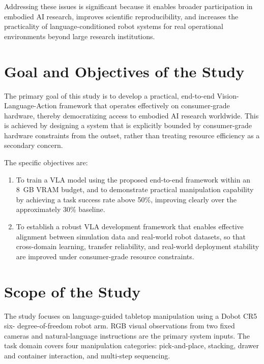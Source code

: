 Addressing these issues is significant because it enables broader participation in
embodied AI research, improves scientific reproducibility, and increases the
practicality of language-conditioned robot systems for real operational environments
beyond large research institutions.



\section{Goal and Objectives of the Study}

The primary goal of this study is to develop a practical, end-to-end
Vision-Language-Action framework that operates effectively on consumer-grade
hardware, thereby democratizing access to embodied AI research worldwide. This is
achieved by designing a system that is explicitly bounded by consumer-grade
hardware constraints from the outset, rather than treating resource efficiency as a
secondary concern.

\noindent The specific objectives are:

\begin{enumerate}
    \item To train a VLA model using the proposed end-to-end framework within an
    8~GB VRAM budget, and to demonstrate practical manipulation capability by
    achieving a task success rate above 50\%, improving clearly over the
    approximately 30\% baseline.

    \item To establish a robust VLA development framework that enables effective
    alignment between simulation data and real-world robot datasets, so that
    cross-domain learning, transfer reliability, and real-world deployment
    stability are improved under consumer-grade resource constraints.
\end{enumerate}



\section{Scope of the Study}


The study focuses on language-guided tabletop manipulation using a Dobot CR5 six-
degree-of-freedom robot arm. RGB visual observations from two fixed cameras and
natural-language instructions are the primary system inputs. The task domain covers
four manipulation categories: pick-and-place, stacking, drawer and container
interaction, and multi-step sequencing.

